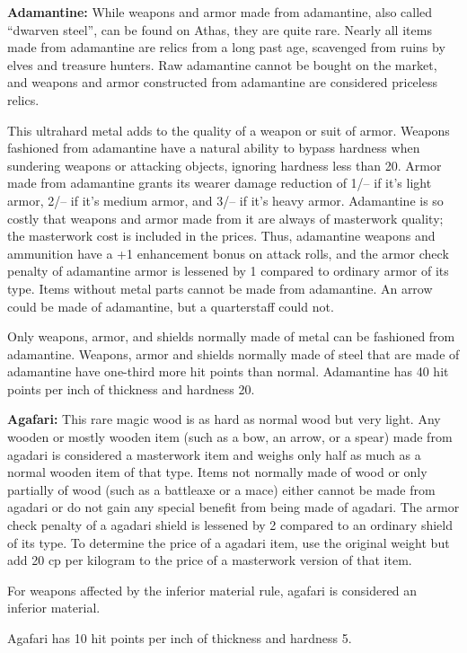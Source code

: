 \textbf{Adamantine:} While weapons and armor made from adamantine, also called ``dwarven steel'', can be found on Athas, they are quite rare. Nearly all items made from adamantine are relics from a long past age, scavenged from ruins by elves and treasure hunters. Raw adamantine cannot be bought on the market, and weapons and armor constructed from adamantine are considered priceless relics.

This ultrahard metal adds to the quality of a weapon or suit of armor. Weapons fashioned from adamantine have a natural ability to bypass hardness when sundering weapons or attacking objects, ignoring hardness less than 20. Armor made from adamantine grants its wearer damage reduction of 1/-- if it's light armor, 2/-- if it's medium armor, and 3/-- if it's heavy armor. Adamantine is so costly that weapons and armor made from it are always of masterwork quality; the masterwork cost is included in the prices. Thus, adamantine weapons and ammunition have a +1 enhancement bonus on attack rolls, and the armor check penalty of adamantine armor is lessened by 1 compared to ordinary armor of its type. Items without metal parts cannot be made from adamantine. An arrow could be made of adamantine, but a quarterstaff could not.

Only weapons, armor, and shields normally made of metal can be fashioned from adamantine. Weapons, armor and shields normally made of steel that are made of adamantine have one-third more hit points than normal. Adamantine has 40 hit points per inch of thickness and hardness 20.

\textbf{Agafari:} This rare magic wood is as hard as normal wood but very light. Any wooden or mostly wooden item (such as a bow, an arrow, or a spear) made from agadari is considered a masterwork item and weighs only half as much as a normal wooden item of that type. Items not normally made of wood or only partially of wood (such as a battleaxe or a mace) either cannot be made from agadari or do not gain any special benefit from being made of agadari. The armor check penalty of a agadari shield is lessened by 2 compared to an ordinary shield of its type. To determine the price of a agadari item, use the original weight but add 20 cp per kilogram to the price of a masterwork version of that item.

For weapons affected by the inferior material rule, agafari is considered an inferior material.

Agafari has 10 hit points per inch of thickness and hardness 5.

